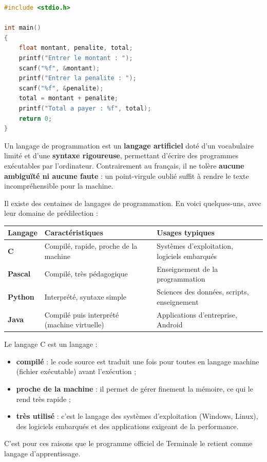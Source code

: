 \documentclass[11pt]{article}
\newcommand{\cle}[1]{{\popxbold\color{popdark}#1}}
\newcounter{popsec}
\newcounter{popsub}
\newcommand{\courssub}[1]{%
  \stepcounter{popsub}%
  \par\vspace{9pt}\noindent{\popxbold\fontsize{11.5}{13}\selectfont\color{popink}{\color{poporange}\thepopsec.\thepopsub}\hspace{6pt}#1}\par\nopagebreak\vspace{4pt}
}
\begin{document}
\begin{lstlisting}[language=C]
#include <stdio.h>

int main()
{
    float montant, penalite, total;
    printf("Entrer le montant : ");
    scanf("%f", &montant);
    printf("Entrer la penalite : ");
    scanf("%f", &penalite);
    total = montant + penalite;
    printf("Total a payer : %f", total);
    return 0;
}
\end{lstlisting}

\courssub{Les langages de programmation}

\begin{definition}
Un \cle{langage de programmation} est un \textbf{langage artificiel} doté d'un vocabulaire limité et d'une \textbf{syntaxe rigoureuse}, permettant d'écrire des programmes exécutables par l'ordinateur. Contrairement au français, il ne tolère \textbf{aucune ambiguïté ni aucune faute} : un point-virgule oublié suffit à rendre le texte incompréhensible pour la machine.
\end{definition}

Il existe des centaines de langages de programmation. En voici quelques-uns, avec leur domaine de prédilection :

\begin{center}
\begin{tabularx}{\linewidth}{|l|X|l|}
\hline
\rowcolor{popblueL} \textbf{Langage} & \textbf{Caractéristiques} & \textbf{Usages typiques} \\
\hline
\textbf{C} & Compilé, rapide, proche de la machine & Systèmes d'exploitation, logiciels embarqués \\
\hline
\textbf{Pascal} & Compilé, très pédagogique & Enseignement de la programmation \\
\hline
\textbf{Python} & Interprété, syntaxe simple & Sciences des données, scripts, enseignement \\
\hline
\textbf{Java} & Compilé puis interprété (machine virtuelle) & Applications d'entreprise, Android \\
\hline
\end{tabularx}
\end{center}

\begin{propriete}[Le langage C]
Le langage \cle{C} est un langage :
\begin{itemize}
\item \textbf{compilé} : le code source est traduit une fois pour toutes en langage machine (fichier exécutable) avant l'exécution ;
\item \textbf{proche de la machine} : il permet de gérer finement la mémoire, ce qui le rend très rapide ;
\item \textbf{très utilisé} : c'est le langage des systèmes d'exploitation (Windows, Linux), des logiciels embarqués et des applications exigeant de la performance.
\end{itemize}
C'est pour ces raisons que le programme officiel de Terminale le retient comme langage d'apprentissage.
\end{propriete}
\end{document}

